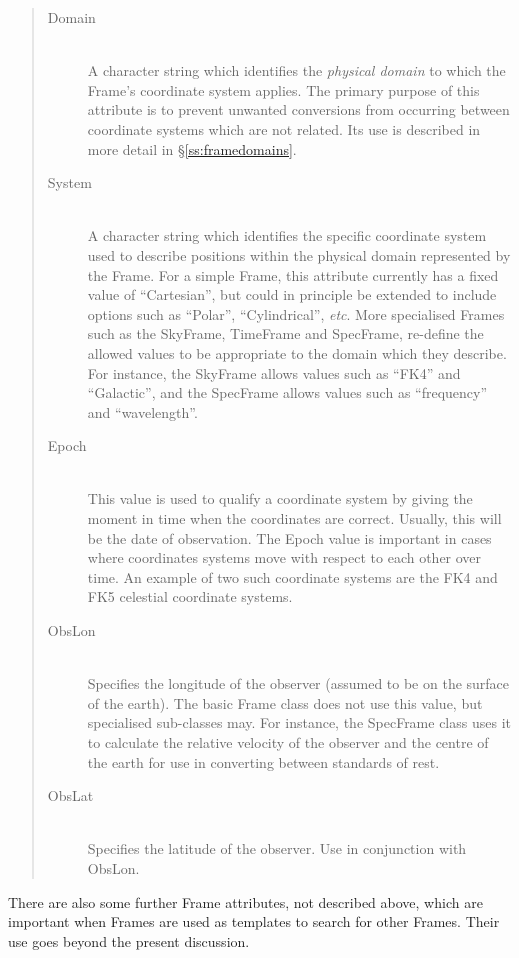 \documentclass[twoside,11pt]{article}
\newcommand{\secref}[1]{\S\ref{#1}}
\newcommand{\secref}[1]{\ref{#1}}
\begin{document}
\begin{quote}
\begin{description}
\item[Domain]\mbox{}\\
A character string which identifies the {\em{physical domain}} to
which the Frame's coordinate system applies. The primary purpose of
this attribute is to prevent unwanted conversions from occurring
between coordinate systems which are not related. Its use is described
in more detail in \secref{ss:framedomains}.

\item[System]\mbox{}\\
A character string which identifies the specific coordinate system used
to describe positions within the physical domain represented by the Frame.
For a simple Frame, this attribute currently has a fixed value of 
``Cartesian'', but could in principle be extended to include options such
as ``Polar'', ``Cylindrical'', {\em{etc}}. More specialised Frames such
as the SkyFrame, TimeFrame  and SpecFrame, re-define the allowed values to be
appropriate to the domain which they describe. For instance, the SkyFrame
allows values such as ``FK4'' and ``Galactic'', and the SpecFrame allows
values such as ``frequency'' and ``wavelength''. 

\item[Epoch]\mbox{}\\
This value is used to qualify a coordinate system by giving the moment in
time when the coordinates are correct. Usually, this will be the date of
observation. The Epoch value is important in cases where coordinates
systems move with respect to each other over time. An example of two such
coordinate systems are the FK4 and FK5 celestial coordinate systems.

\item[ObsLon]\mbox{}\\
Specifies the longitude of the observer (assumed to be on the surface of
the earth). The basic Frame class does not use this value, but
specialised sub-classes may. For instance, the SpecFrame class uses it to
calculate the relative velocity of the observer and the centre of the
earth for use in converting between standards of rest.

\item[ObsLat]\mbox{}\\
Specifies the latitude of the observer. Use in conjunction with ObsLon.

\end{description}
\end{quote}

There are also some further Frame attributes, not described above,
which are important when Frames are used as templates to search for
other Frames. Their use goes beyond the present discussion.
\end{document}
